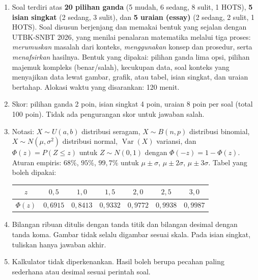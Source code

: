 \documentclass[a4paper,11pt]{article}
\renewcommand{\arraystretch}{1.35}
\newcounter{no}
\newcommand{\Var}{\operatorname{Var}}
\begin{document}
\begin{tcolorbox}[colback=white,colframe=accc,boxrule=0.8pt,arc=3pt,left=8pt,right=8pt,top=4pt,bottom=4pt,title={\bfseries Petunjuk Pengerjaan},coltitle=white,fonttitle=\small]
\small
\begin{enumerate}[leftmargin=1.4em,itemsep=1pt,topsep=1pt]
\item Soal terdiri atas \textbf{20 pilihan ganda} (5 mudah, 6 sedang, 8 sulit, 1 HOTS), \textbf{5 isian singkat} (2 sedang, 3 sulit), dan \textbf{5 uraian (essay)} (2 sedang, 2 sulit, 1 HOTS). Soal disusun berjenjang dan memakai bentuk yang sejalan dengan UTBK-SNBT 2026, yang menilai penalaran matematika melalui tiga proses: \emph{merumuskan} masalah dari konteks, \emph{menggunakan} konsep dan prosedur, serta \emph{menafsirkan} hasilnya. Bentuk yang dipakai: pilihan ganda lima opsi, pilihan majemuk kompleks (benar/salah), kecukupan data, soal konteks yang menyajikan data lewat gambar, grafik, atau tabel, isian singkat, dan uraian bertahap. Alokasi waktu yang disarankan: 120 menit.
\item Skor: pilihan ganda 2 poin, isian singkat 4 poin, uraian 8 poin per soal (total 100 poin). Tidak ada pengurangan skor untuk jawaban salah.
\item Notasi: $X\sim U(a,b)$ distribusi seragam, $X\sim B(n,p)$ distribusi binomial, $X\sim N(\mu,\sigma^2)$ distribusi normal, $\Var(X)$ variansi, dan $\Phi(z)=P(Z\le z)$ untuk $Z\sim N(0,1)$ dengan $\Phi(-z)=1-\Phi(z)$. Aturan empiris: $68\%$, $95\%$, $99{,}7\%$ untuk $\mu\pm\sigma$, $\mu\pm2\sigma$, $\mu\pm3\sigma$. Tabel yang boleh dipakai:
\begin{center}\small\renewcommand{\arraystretch}{1.2}
\begin{tabular}{|c|c|c|c|c|c|c|}\hline
$z$ & $0{,}5$ & $1{,}0$ & $1{,}5$ & $2{,}0$ & $2{,}5$ & $3{,}0$\\\hline
$\Phi(z)$ & $0{,}6915$ & $0{,}8413$ & $0{,}9332$ & $0{,}9772$ & $0{,}9938$ & $0{,}9987$\\\hline
\end{tabular}\end{center}
\item Bilangan ribuan ditulis dengan tanda titik dan bilangan desimal dengan tanda koma. Gambar tidak selalu digambar sesuai skala. Pada isian singkat, tuliskan hanya jawaban akhir.
\item Kalkulator tidak diperkenankan. Hasil boleh berupa pecahan paling sederhana atau desimal sesuai perintah soal.
\end{enumerate}
\end{tcolorbox}
\end{document}
